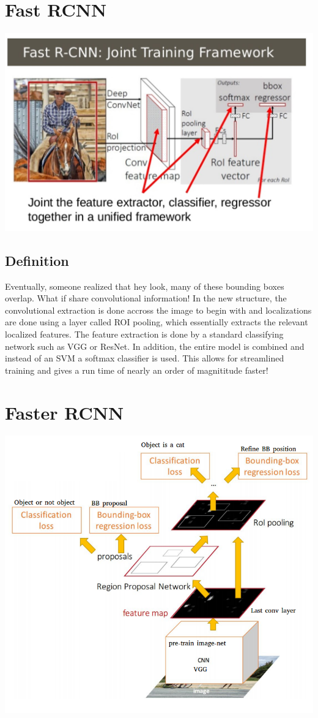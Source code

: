 \documentclass{article}
\begin{document}
\section{Fast RCNN}
\begin{center}
\includegraphics[scale=0.5]{FRCNN}
\end{center}
\subsection{Definition}
Eventually, someone realized that hey look, many of these bounding boxes overlap. What if share convolutional information! In the new structure, the convolutional extraction is done accross the image to begin with and localizations are done using a layer called ROI pooling, which essentially extracts the relevant localized features. The feature extraction is done by a standard classifying network such as VGG or ResNet. In addition, the entire model is combined and instead of an SVM a softmax classifier is used. This allows for streamlined training and gives a run time of nearly an order of magnititude faster!

\section{Faster RCNN}
\begin{center}
\includegraphics[scale=0.5]{fasterRCNN}
\end{center}
\end{document}
